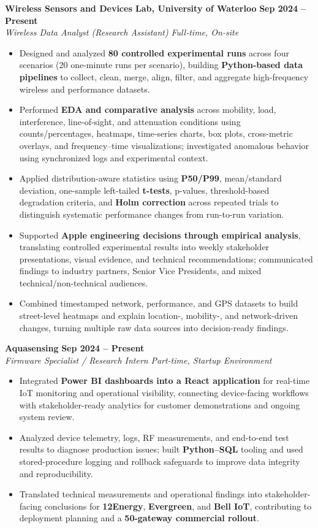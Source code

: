 \documentclass[letterpaper,11pt]{article}
\newcommand{\resumeSubheading}[4]{
  \textbf{#1} \hfill \textbf{#2} \\
  \textit{#3} \hfill \textit{#4} \\
}
\begin{document}
\resumeSubheading
{Wireless Sensors and Devices Lab, University of Waterloo}{Sep 2024 -- Present}
{Wireless Data Analyst (Research Assistant)}{Full-time, On-site}
\begin{itemize}
    \item Designed and analyzed \textbf{80 controlled experimental runs} across four scenarios (20 one-minute runs per scenario), building \textbf{Python-based data pipelines} to collect, clean, merge, align, filter, and aggregate high-frequency wireless and performance datasets.
    \item Performed \textbf{EDA and comparative analysis} across mobility, load, interference, line-of-sight, and attenuation conditions using counts/percentages, heatmaps, time-series charts, box plots, cross-metric overlays, and frequency--time visualizations; investigated anomalous behavior using synchronized logs and experimental context.
    \item Applied distribution-aware statistics using \textbf{P50/P99}, mean/standard deviation, one-sample left-tailed \textbf{t-tests}, p-values, threshold-based degradation criteria, and \textbf{Holm correction} across repeated trials to distinguish systematic performance changes from run-to-run variation.
    \item Supported \textbf{Apple engineering decisions through empirical analysis}, translating controlled experimental results into weekly stakeholder presentations, visual evidence, and technical recommendations; communicated findings to industry partners, Senior Vice Presidents, and mixed technical/non-technical audiences.
    \item Combined timestamped network, performance, and GPS datasets to build street-level heatmaps and explain location-, mobility-, and network-driven changes, turning multiple raw data sources into decision-ready findings.
\end{itemize}

\resumeSubheading
{Aquasensing}{Sep 2024 -- Present}
{Firmware Specialist / Research Intern}{Part-time, Startup Environment}
\begin{itemize}
    \item Integrated \textbf{Power BI dashboards into a React application} for real-time IoT monitoring and operational visibility, connecting device-facing workflows with stakeholder-ready analytics for customer demonstrations and ongoing system review.
    \item Analyzed device telemetry, logs, RF measurements, and end-to-end test results to diagnose production issues; built \textbf{Python--SQL} tooling and used stored-procedure logging and rollback safeguards to improve data integrity and reproducibility.
    \item Translated technical measurements and operational findings into stakeholder-facing conclusions for \textbf{12Energy}, \textbf{Evergreen}, and \textbf{Bell IoT}, contributing to deployment planning and a \textbf{50-gateway commercial rollout}.
\end{itemize}
\end{document}
